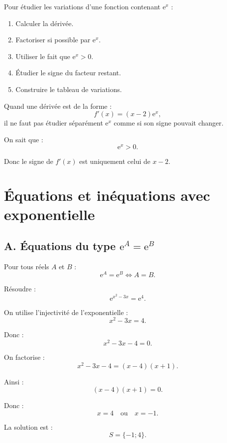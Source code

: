 \documentclass[11pt,a4paper]{article}
\newcommand{\e}{\mathrm{e}}
\begin{document}
\begin{methode}
Pour étudier les variations d'une fonction contenant $\e^x$ :
\begin{enumerate}
    \item Calculer la dérivée.
    \item Factoriser si possible par $\e^x$.
    \item Utiliser le fait que $\e^x>0$.
    \item Étudier le signe du facteur restant.
    \item Construire le tableau de variations.
\end{enumerate}
\end{methode}

\begin{erreur}
Quand une dérivée est de la forme :
\[
f'(x)=(x-2)\e^x,
\]
il ne faut pas étudier séparément $\e^x$ comme si son signe pouvait changer.

On sait que :
\[
\e^x>0.
\]

Donc le signe de $f'(x)$ est uniquement celui de $x-2$.
\end{erreur}

\section{Équations et inéquations avec exponentielle}

\subsection*{A. Équations du type $\e^A=\e^B$}

\begin{propriete}
Pour tous réels $A$ et $B$ :
\[
\e^A=\e^B \Longleftrightarrow A=B.
\]
\end{propriete}

\begin{exemplebox}
Résoudre :
\[
\e^{x^2-3x}=\e^{4}.
\]

On utilise l'injectivité de l'exponentielle :
\[
x^2-3x=4.
\]

Donc :
\[
x^2-3x-4=0.
\]

On factorise :
\[
x^2-3x-4=(x-4)(x+1).
\]

Ainsi :
\[
(x-4)(x+1)=0.
\]

Donc :
\[
x=4 \quad \text{ou} \quad x=-1.
\]

La solution est :
\[
S=\{-1;4\}.
\]
\end{exemplebox}
\end{document}
